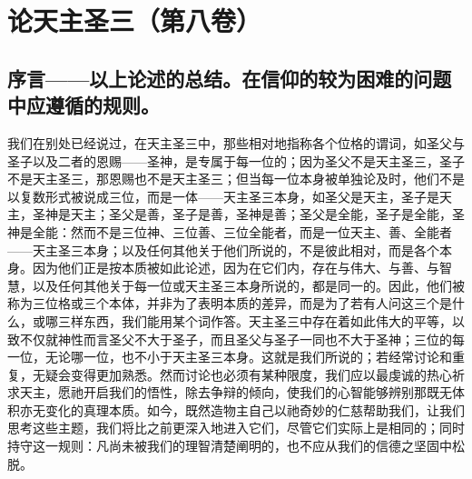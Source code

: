 

\section{论天主圣三（第八卷）}

\par


\subsection{序言——以上论述的总结。在信仰的较为困难的问题中应遵循的规则。}

我们在别处已经说过，在天主圣三中，那些相对地指称各个位格的谓词，如圣父与圣子以及二者的恩赐——圣神，是专属于每一位的；因为圣父不是天主圣三，圣子不是天主圣三，那恩赐也不是天主圣三；但当每一位本身被单独论及时，他们不是以复数形式被说成三位，而是一体——天主圣三本身，如圣父是天主，圣子是天主，圣神是天主；圣父是善，圣子是善，圣神是善；圣父是全能，圣子是全能，圣神是全能：然而不是三位神、三位善、三位全能者，而是一位天主、善、全能者——天主圣三本身；以及任何其他关于他们所说的，不是彼此相对，而是各个本身。因为他们正是按本质被如此论述，因为在它们内，存在与伟大、与善、与智慧，以及任何其他关于每一位或天主圣三本身所说的，都是同一的。因此，他们被称为三位格或三个本体，并非为了表明本质的差异，而是为了若有人问这三个是什么，或哪三样东西，我们能用某个词作答。天主圣三中存在着如此伟大的平等，以致不仅就神性而言圣父不大于圣子，而且圣父与圣子一同也不大于圣神；三位的每一位，无论哪一位，也不小于天主圣三本身。这就是我们所说的；若经常讨论和重复，无疑会变得更加熟悉。然而讨论也必须有某种限度，我们应以最虔诚的热心祈求天主，愿祂开启我们的悟性，除去争辩的倾向，使我们的心智能够辨别那既无体积亦无变化的真理本质。如今，既然造物主自己以祂奇妙的仁慈帮助我们，让我们思考这些主题，我们将比之前更深入地进入它们，尽管它们实际上是相同的；同时持守这一规则：凡尚未被我们的理智清楚阐明的，也不应从我们的信德之坚固中松脱。\par


